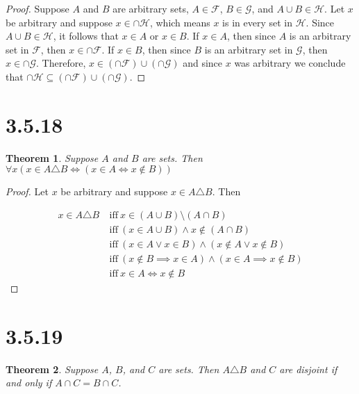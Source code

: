 \documentclass{article}
\newcommand{\F}{\mathcal{F}}
\newcommand{\G}{\mathcal{G}}
\newtheorem*{theorem}{Theorem}  %
\begin{document}
\begin{proof}
Suppose $A$ and $B$ are arbitrary sets, $A \in \F$, $B \in \G$, and $A \cup B \in \mathcal{H}$. Let $x$ be arbitrary and suppose $x \in \cap \mathcal{H}$, which means $x$ is in every set in $\mathcal{H}$. Since $A \cup B \in \mathcal{H}$, it follows that $x \in A$ or $x \in B$. If $x \in A$, then since $A$ is an arbitrary set in $\F$, then $x \in \cap \F$. If $x \in B$, then since $B$ is an arbitrary set in $\G$, then $x \in \cap \G$. Therefore, $ x \in ( \cap \F ) \cup ( \cap \G )$ and since $x$ was arbitrary we conclude that $\cap \mathcal{H} \subseteq ( \cap \F ) \cup ( \cap \G )$.
\end{proof}

\section*{3.5.18}
\begin{theorem} Suppose $A$ and $B$ are sets. Then $\forall x (x \in A \triangle B \iff (x \in A \iff x \notin B))$
\end{theorem}

\begin{proof}
Let $x$ be arbitrary and suppose $x \in A \triangle B$. Then

\begin{align*}
x \in A \triangle B ~ &\text{iff} ~ x \in (A \cup B) \setminus (A \cap B)\\
&\text{iff} ~ (x \in A \cup B) \land x \notin (A \cap B)  \\
&\text{iff} ~ (x \in A \lor x \in B) \land (x \notin A \lor x \notin B) \\
&\text{iff} ~ (x \notin B \implies x \in A) \land (x \in A \implies x \notin B) \\
&\text{iff} ~ x \in A \iff x \notin B
\end{align*}
\end{proof}


\section*{3.5.19}
\begin{theorem} Suppose $A$, $B$, and $C$ are sets. Then $A \triangle B$ and $C$ are disjoint if and only if $A \cap C = B \cap C$.
\end{theorem}
\end{document}
